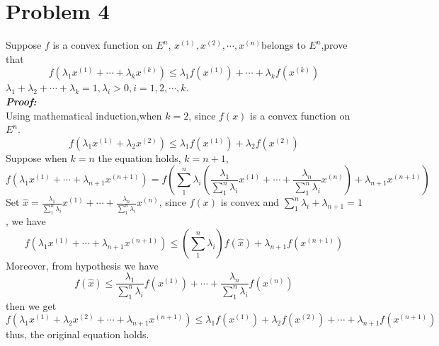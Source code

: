 \documentclass[paper=a4, fontsize=11pt]{scrartcl} %
\numberwithin{equation}{section} %
\numberwithin{figure}{section} %
\numberwithin{table}{section} %
\begin{document}
\section{Problem 4}
Suppose $f$ is a convex function on $E^n$, $x^{(1)},x^{(2)},\cdots,x^{(n)}$belongs to $E^n$,prove that
\begin{equation}
f(\lambda_1x^{(1)}+\cdots+\lambda_kx^{(k)})\leq\lambda_1f(x^{(1)})+\cdots+\lambda_kf(x^{(k)}) \nonumber
\end{equation}
$\lambda_1+\lambda_2+\cdots+\lambda_k=1, \lambda_i>0, i= 1,2,\cdots,k$.\\
\emph{\textbf{Proof:}}\\
Using mathematical induction,when $k=2$, since $f(x)$ is a convex function on $E^n$.
\begin{equation}
f(\lambda_1x^{(1)}+\lambda_2x^{(2)})\leq \lambda_1f(x^{(1)})+ \lambda_2f(x^{(2)}) \nonumber
\end{equation}
Suppose when $k = n$ the equation holds, $k=n+1$,
\begin{equation}
f(\lambda_1x^{(1)}+\cdots+\lambda_{n+1}x^{(n+1)})= f(\sum_1^n\lambda_i(\frac{\lambda_1}{\sum_1^n\lambda_i}x^{(1)}+\cdots+\frac{\lambda_n}{\sum_1^n\lambda_i}x^{(n)})+\lambda_{n+1}x^{(n+1)}) \nonumber
\end{equation}
Set $\hat{x} = \frac{\lambda_1}{\sum_1^n\lambda_i}x^{(1)}+\cdots+\frac{\lambda_n}{\sum_1^n\lambda_i}x^{(n)}$, since $f (x)$ is convex and $\sum_1^n\lambda_i+\lambda_{n+1}=1$, we have
\begin{equation}
f(\lambda_1x^{(1)}+\cdots+\lambda_{n+1}x^{(n+1)})\leq (\sum_1^n\lambda_i)f(\hat{x})+\lambda_{n+1}f(x^{(n+1)})\nonumber
\end{equation}
Moreover, from hypothesis we have
\begin{equation}
f(\hat{x})\leq \frac{\lambda_1}{\sum_1^n\lambda_i}f(x^{(1)})+\cdots+ \frac{\lambda_n}{\sum_1^n\lambda_i}f(x^{(n)})\nonumber
\end{equation}
then we get
\begin{equation}
f(\lambda_1x^{(1)}+\lambda_2x^{(2)}+\cdots+\lambda_{n+1}x^{(n+1)})\leq \lambda_1f(x^{(1)})+\lambda_2f(x^{(2)})+\cdots+\lambda_{n+1}f(x^{(n+1)})\nonumber
\end{equation}
thus, the original equation holds.
\end{document}
